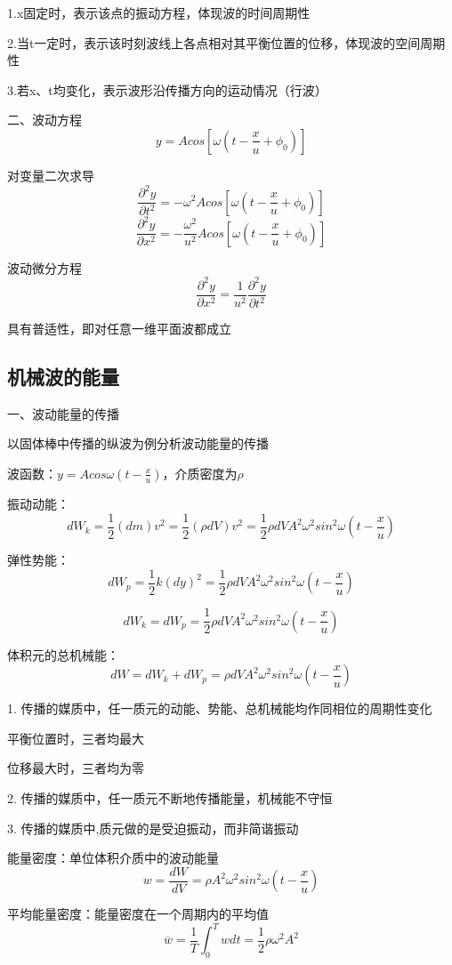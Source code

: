 \documentclass[UTF8]{article}
\begin{document}
    1.x固定时，表示该点的振动方程，体现波的时间周期性

    2.当t一定时，表示该时刻波线上各点相对其平衡位置的位移，体现波的空间周期性

    3.若x、t均变化，表示波形沿传播方向的运动情况（行波）

    二、波动方程
    \[y = Acos[\omega(t - \frac{x}{u} + \phi_0)]\]

    对变量二次求导
    \[\frac{\partial^2y}{\partial t^2} = -\omega^2Acos[\omega(t - \frac{x}{u} + \phi_0)]\]
    \[\frac{\partial^2y}{\partial x^2} = -\frac{\omega^2}{u^2}Acos[\omega(t - \frac{x}{u} + \phi_0)]\]

    波动微分方程
    \[\frac{\partial^2y}{\partial x^2} = \frac{1}{u^2}\frac{\partial^2y}{\partial t^2}\]

    具有普适性，即对任意一维平面波都成立

\subsection{机械波的能量}

    一、波动能量的传播

    以固体棒中传播的纵波为例分析波动能量的传播

    波函数：$y = Acos\omega(t - \frac{x}{u})$，介质密度为$\rho$

    振动动能：
    \[dW_k = \frac{1}{2}(dm)v^2 = \frac{1}{2}(\rho dV)v^2 = \frac{1}{2}\rho dVA^2\omega^2sin^2\omega(t - \frac{x}{u})\]

    弹性势能：
    \[dW_p = \frac{1}{2}k(dy)^2 = \frac{1}{2}\rho dVA^2\omega^2sin^2\omega (t - \frac{x}{u})\]

    \[dW_k = dW_p = \frac{1}{2}\rho dVA^2\omega^2sin^2\omega(t - \frac{x}{u})\]

    体积元的总机械能：
    \[dW = dW_k + dW_p = \rho dVA^2\omega^2sin^2\omega(t - \frac{x}{u})\]

    1. 传播的媒质中，任一质元的动能、势能、总机械能均作同相位的周期性变化

    \;\;平衡位置时，三者均最大

    \;\;位移最大时，三者均为零

    2. 传播的媒质中，任一质元不断地传播能量，机械能不守恒

    3. 传播的媒质中,质元做的是受迫振动，而非简谐振动

    能量密度：单位体积介质中的波动能量
    \[w = \frac{dW}{dV} = \rho A^2\omega^2sin^2\omega(t - \frac{x}{u})\]

    平均能量密度：能量密度在一个周期内的平均值
    \[\overline{w} = \frac{1}{T}\int_0^Twdt = \frac{1}{2}\rho\omega^2 A^2\]
\end{document}
